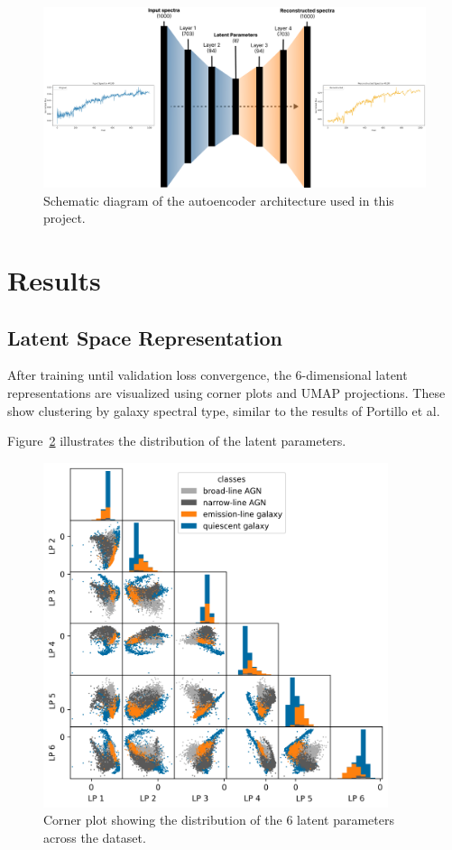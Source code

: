 \documentclass[11pt]{article}
\begin{document}
\begin{figure}[h!]
    \centering
    \includegraphics[width=\textwidth]{autoencoder_schematic.pdf}
    \caption{Schematic diagram of the autoencoder architecture used in this project.}
    \label{fig:architecture}
\end{figure}

\section{Results}
\subsection{Latent Space Representation}
After training until validation loss convergence, the 6-dimensional latent representations are visualized using corner plots and UMAP projections. These show clustering by galaxy spectral type, similar to the results of Portillo et al.

Figure~\ref{fig:cornerplot} illustrates the distribution of the latent parameters.

\begin{figure}[h!]
    \centering
    \includegraphics[width=0.9\textwidth]{corner.pdf}
    \caption{Corner plot showing the distribution of the 6 latent parameters across the dataset.}
    \label{fig:cornerplot}
\end{figure}
\end{document}
